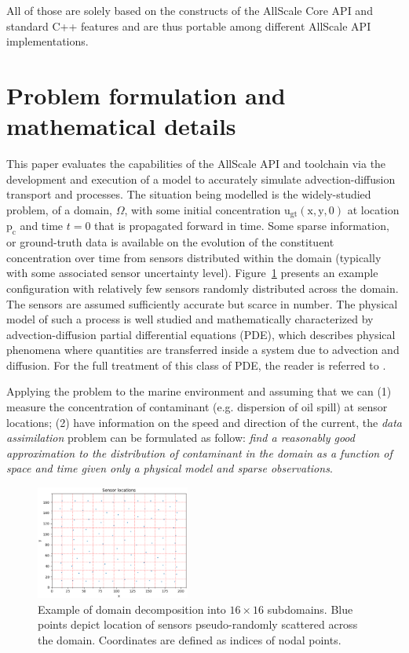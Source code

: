\documentclass[conference,compsoc]{IEEEtran}
\begin{document}
All of those are solely based on the constructs of the AllScale Core API and
standard C++ features and are thus portable among different AllScale API
implementations.

\section{Problem formulation and mathematical details}
\label{sec:AMDADOS}

This paper evaluates the capabilities of the AllScale API and toolchain via the development and execution of a model to accurately simulate advection-diffusion transport and processes. The situation being modelled is the widely-studied problem, of a domain, $\Omega$, with some initial concentration $\mathrm{u_{gt}(x,y,0)}$ at location $\mathrm{p_c}$ and time $t=0$ that is propagated forward in time. Some sparse information, or ground-truth data is available on the evolution of the constituent concentration over time from sensors distributed within the domain (typically with some associated sensor uncertainty level). Figure~\ref{fig:sensors} presents an example configuration with relatively few sensors randomly distributed across the domain. The sensors are assumed sufficiently accurate but scarce in number. The physical model of such a process is well studied and mathematically characterized by advection-diffusion partial differential equations (PDE), which describes physical phenomena where quantities are transferred inside a system due to advection and diffusion. For the full treatment of this class of PDE, the reader is referred to \cite{Hundsdorfer03}.

Applying the problem to the marine environment and assuming that we can (1) measure the concentration of contaminant (e.g. dispersion of oil spill) at sensor locations; (2) have information on the speed and direction of the current, the \textit{data assimilation} problem can be formulated as follow: \textit{find a reasonably good approximation to the distribution of contaminant in the domain as a function of space and time given only a physical model and sparse observations}.

\begin{figure}
\includegraphics[width=0.45\textwidth]{images/sensors-Nx208-Ny176}
\caption{Example of domain decomposition into ${16{\times}16}$ subdomains. Blue points depict location of sensors pseudo-randomly scattered across the domain. Coordinates are defined as indices of nodal points.}
\label{fig:sensors}
\end{figure}
\end{document}
